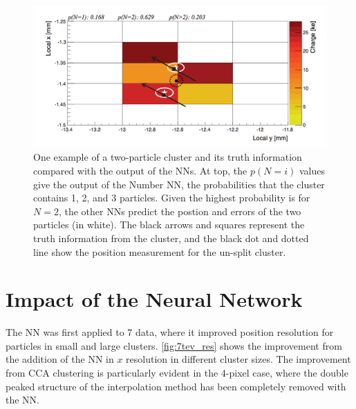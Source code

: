 \begin{centering}
\begin{figure}[bth]
\myfloatalign
\includegraphics[width=.90\linewidth]{figures/nn/merged_cluster.png}
\caption{One example of a two-particle cluster and its truth information compared with the output of the \acp{NN}. At top, the $p(N=i)$ values give the output of the Number \ac{NN}, the probabilities that the cluster contains 1, 2, and 3 particles. Given the highest probability is for $N=2$, the other \acp{NN} predict the postion and errors of the two particles (in white). The black arrows and squares represent the truth information from the cluster, and the black dot and dotted line show the position measurement for the un-split cluster.}
\label{fig:merged_cluster}
\end{figure}
\end{centering}

\section{Impact of the Neural Network}

The \ac{NN} was first applied to 7 \tev data, where it improved position resolution for particles in small and large clusters. \autoref{fig:7tev_res} shows the improvement from the addition of the \ac{NN} in $x$ resolution in different cluster sizes. The improvement from \ac{CCA} clustering is particularly evident in the 4-pixel case, where the double peaked structure of the interpolation method has been completely removed with the \ac{NN}.  

